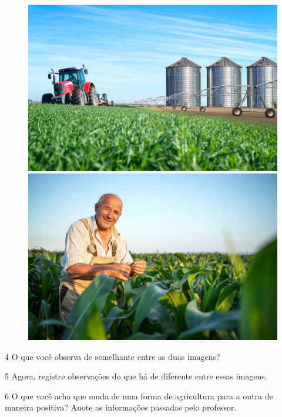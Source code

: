 \begin{figure}[htpb!]
\includegraphics[width=.5\textwidth]{./imgs/img57.png}
\includegraphics[width=.5\textwidth]{./imgs/img58.png}
\caption{}
\end{figure}


\num{4} O que você observa de semelhante entre as duas imagens?


\num{5} Agora, registre observações do que há de diferente entre essas imagens.


\num{6} O que você acha que muda de uma forma de agricultura para a outra de
maneira positiva? Anote as informações passadas pelo professor. 



